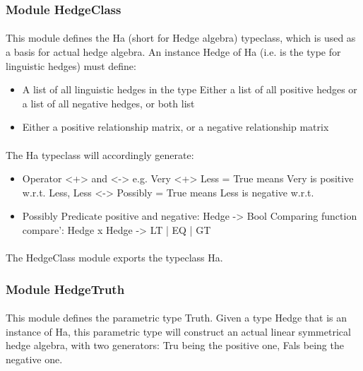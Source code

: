 \documentclass[../gr-final.tex]{subfiles}
\begin{document}
\subsubsection{Module HedgeClass}

\paragraph{}This module defines the Ha (short for Hedge algebra) typeclass, which is used as a basis for  actual hedge algebra. An instance Hedge of Ha (i.e. is the type for linguistic hedges) must define:

\begin{itemize}
\item A list of all linguistic hedges in the type Either a list of all
  positive hedges or a list of all negative hedges, or both list
\item  Either a positive relationship matrix, or a negative relationship
  matrix
\end{itemize}

\paragraph{}The Ha typeclass will accordingly generate:

\begin{itemize}
\item Operator <+> and <-> e.g. Very <+> Less = True means Very is
  positive w.r.t. Less, Less <-> Possibly = True means Less is
  negative w.r.t. 
\item Possibly Predicate positive and negative: Hedge ->
  Bool Comparing function compare': Hedge x Hedge -> LT | EQ | GT
\end{itemize}

\paragraph{}The HedgeClass module exports the typeclass Ha.

\subsubsection{Module HedgeTruth}


\paragraph{}This module defines the parametric type Truth. Given
a type Hedge that is an instance of Ha, this parametric type will
construct an actual linear symmetrical hedge algebra, with two
generators: Tru being the positive one, Fals being the negative
one. \\
\end{document}
